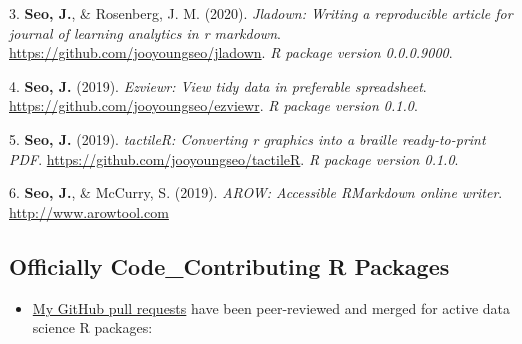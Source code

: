 \documentclass[11pt,a4paper,]{awesome-cv}
\providecommand{\tightlist}{%
	\setlength{\itemsep}{0pt}\setlength{\parskip}{0pt}}
\begin{document}
\leavevmode{}%
3. \textbf{Seo, J.}, \& Rosenberg, J. M. (2020). \emph{Jladown: Writing
a reproducible article for journal of learning analytics in r markdown}.
\url{https://github.com/jooyoungseo/jladown}. \emph{R package version
0.0.0.9000}.

\leavevmode{}%
4. \textbf{Seo, J.} (2019). \emph{Ezviewr: View tidy data in preferable
spreadsheet}. \url{https://github.com/jooyoungseo/ezviewr}. \emph{R
package version 0.1.0}.

\leavevmode{}%
5. \textbf{Seo, J.} (2019). \emph{tactileR: Converting r graphics into a
braille ready-to-print PDF}.
\url{https://github.com/jooyoungseo/tactileR}. \emph{R package version
0.1.0}.

\leavevmode{}%
6. \textbf{Seo, J.}, \& McCurry, S. (2019). \emph{AROW: Accessible
RMarkdown online writer}. \url{http://www.arowtool.com}

\hypertarget{officially-code_contributing-r-packages}{%
\subsection{Officially Code\_Contributing R
Packages}\label{officially-code_contributing-r-packages}}

\begin{itemize}
\tightlist
\item
  \href{https://github.com/pulls?q=is\%3Apr+author\%3Ajooyoungseo+archived\%3Afalse+is\%3Aclosed}{My
  GitHub pull requests} have been peer-reviewed and merged for active
  data science R packages:
\end{itemize}
\end{document}
